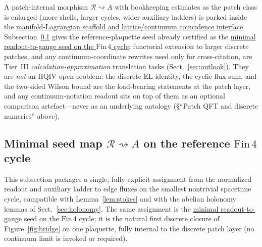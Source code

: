 \documentclass[11pt]{amsart}
\begin{document}
A patch-internal morphism \(\mathcal{R}\rightsquigarrow A\) with bookkeeping estimates as the patch class is enlarged (more shells, larger cycles, wider auxiliary ladders) is parked inside the \hyperref[lean:scaffold-bridge]{manifold-Lagrangian scaffold and lattice/continuum coincidence interface}. Subsection~\ref{subsec:minimal-seed} gives the reference-plaquette seed already certified as the \hyperref[lean:readout-seed]{minimal readout-to-gauge seed on the \(\mathrm{Fin}\,4\) cycle}; functorial extension to larger discrete patches, and any continuum-coordinate rewrites used only for cross-citation, are Tier~III \emph{calculation-approximation} translation tasks (Sect.~\ref{sec:outlook}). They are \emph{not} an HQIV open problem: the discrete EL identity, the cyclic flux sum, and the two-sided Wilson bound are the load-bearing statements at the patch layer, and any continuum-notation readout sits on top of them as an optional comparison artefact---never as an underlying ontology (\S``Patch QFT and discrete numerics'' above).

\subsection{Minimal seed map \texorpdfstring{$\mathcal{R}\rightsquigarrow A$}{R to A} on the reference \texorpdfstring{$\mathrm{Fin}\,4$}{Fin4} cycle}
\label{subsec:minimal-seed}

This subsection packages a single, fully explicit assignment from the normalized readout and auxiliary ladder to edge fluxes on the smallest nontrivial spacetime cycle, compatible with Lemma~\ref{lem:stokes} and with the abelian holonomy lemmas of Sect.~\ref{sec:holonomy}. The same assignment is the \hyperref[lean:readout-seed]{minimal readout-to-gauge seed on the \(\mathrm{Fin}\,4\) cycle}; it is the natural first discrete closure of Figure~\ref{fig:bridge} on one plaquette, fully internal to the discrete patch layer (no continuum limit is invoked or required).
\end{document}
